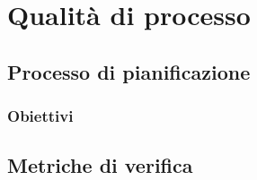 \chapter{Qualità di processo}%
\section{Processo di pianificazione}
\subsection{Obiettivi}
\section{Metriche di verifica}

